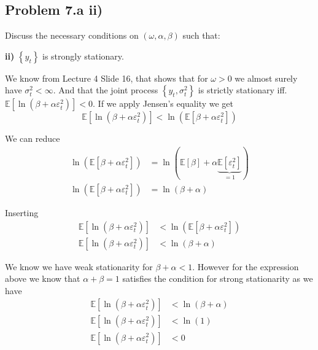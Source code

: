 \documentclass{EconHomework}
\begin{document}
\subsection{Problem 7.a ii)}
\begin{tcolorbox}[colback=white]
    Discuss the necessary conditions on $(\omega, \alpha, \beta)$ such that: 
    
    \textbf{ii)} $\left\{y_{t}\right\}$ is strongly stationary.
\end{tcolorbox}


We know from Lecture 4 Slide 16, that \cite{nelson1990}
 shows that for $\omega>0$ we almost surely have $\sigma_{t}^{2}<\infty$.
And that the joint process $\left\{ y_{t},\sigma_{t}^{2}\right\} $
is strictly stationary iff. $\mathbb{E}\left[\ln\left(\beta+\alpha\varepsilon_{t}^{2}\right)\right]<0$.
If we apply Jensen's equality we get
\[
\mathbb{E}\left[\ln\left(\beta+\alpha\varepsilon_{t}^{2}\right)\right]<\ln\left(\mathbb{E}\left[\beta+\alpha\varepsilon_{t}^{2}\right]\right)
\]

We can reduce 
\begin{align*}
\ln\left(\mathbb{E}\left[\beta+\alpha\varepsilon_{t}^{2}\right]\right) & =\ln\left(\mathbb{E}\left[\beta\right]+\alpha\underbrace{\mathbb{E}\left[\varepsilon_{t}^{2}\right]}_{=1}\right)\\
\ln\left(\mathbb{E}\left[\beta+\alpha\varepsilon_{t}^{2}\right]\right) & =\ln\left(\beta+\alpha\right)
\end{align*}

Inserting
\begin{align*}
\mathbb{E}\left[\ln\left(\beta+\alpha\varepsilon_{t}^{2}\right)\right] & <\ln\left(\mathbb{E}\left[\beta+\alpha\varepsilon_{t}^{2}\right]\right)\\
\mathbb{E}\left[\ln\left(\beta+\alpha\varepsilon_{t}^{2}\right)\right] & <\ln\left(\beta+\alpha\right)
\end{align*}

We know we have weak stationarity for $\beta+\alpha<1$. However for
the expression above we know that $\alpha+\beta=1$ satisfies the
condition for strong stationarity as we have
\begin{align*}
\mathbb{E}\left[\ln\left(\beta+\alpha\varepsilon_{t}^{2}\right)\right] & <\ln\left(\beta+\alpha\right)\\
\mathbb{E}\left[\ln\left(\beta+\alpha\varepsilon_{t}^{2}\right)\right] & <\ln\left(1\right)\\
\mathbb{E}\left[\ln\left(\beta+\alpha\varepsilon_{t}^{2}\right)\right] & <0
\end{align*}
\end{document}
